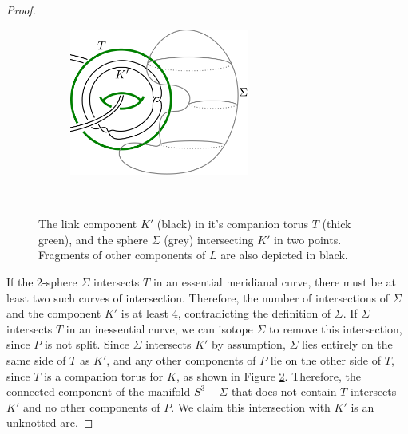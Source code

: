 \documentclass[12pt]{amsart}
\theoremstyle{definition}
\theoremstyle{remark}
\begin{document}
\begin{proof}
\begin{figure}[ht]
\centering
    \begin{subfigure}[b]{0.5\textwidth}
        \centering
        \includegraphics[height=1.9in]{lemmapic.png}
        \caption{}
        \label{fig_lemmapica}
    \end{subfigure}%
~~~~~
    \begin{subfigure}[b]{0.4\textwidth}
        \centering
        \caption{}
        \label{fig_lemmapicb}
    \end{subfigure}
\caption{The link component $K'$ (black) in it's companion torus $T$ (thick green), and the sphere $\Sigma$ (grey) intersecting $K'$ in two points.
Fragments of other components of $L$ are also depicted in black.
}
\label{fig_lemmapic}

\end{figure}

If the 2-sphere $\Sigma$ intersects $T$ in an essential meridianal curve, there must be at least two such curves of intersection.
Therefore, the number of intersections of $\Sigma$ and the component $K'$ is at least 4, contradicting the definition of $\Sigma$.
If $\Sigma$ intersects $T$ in an inessential curve, we can isotope $\Sigma$ to remove this intersection, since $P$ is not split.
Since $\Sigma$ intersects $K'$ by assumption, $\Sigma$ lies entirely on the same side of $T$ as $K'$, and any other components of $P$ lie on the other side of $T$, since $T$ is a companion torus for $K$, as shown in Figure \ref{fig_lemmapicb}.
Therefore, the connected component of the manifold $S^3 - \Sigma$ that does not contain $T$ intersects $K'$ and no other components of $P$.
We claim this intersection with $K'$ is an unknotted arc.




\end{proof}
\end{document}
